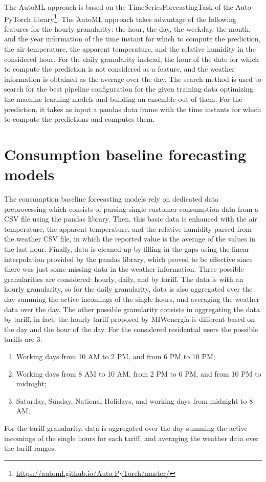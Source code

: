 The AutoML approach is based on the TimeSeriesForecastingTask of the Auto-PyTorch library\footnote{ \url{https://automl.github.io/Auto-PyTorch/master/} }.
The AutoML approach takes advantage of the following features for the hourly granularity: the hour, the day, the weekday, the month, and the year information of the time instant for which to compute the prediction, the air temperature, the apparent temperature, and the relative humidity in the considered hour.
For the daily granularity instead, the hour of the date for which to compute the prediction is not considered as a feature, and the weather information is obtained as the average over the day.
The search method is used to search for the best pipeline configuration for the given training data optimizing the machine learning models and building an ensemble out of them.
For the prediction, it takes as input a pandas data frame with the time instants for which to compute the predictions and computes them.


\section{Consumption baseline forecasting models}
\label{sec:baselineimpl}
\vspace{0.2 cm}

The consumption baseline forecasting models rely on dedicated data preprocessing which consists of parsing single customer consumption data from a CSV file using the pandas library.
Then, this basic data is enhanced with the air temperature, the apparent temperature, and the relative humidity parsed from the weather CSV file, in which the reported value is the average of the values in the last hour.
Finally, data is cleaned up by filling in the gaps using the linear interpolation provided by the pandas library, which proved to be effective since there was just some missing data in the weather information.
Three possible granularities are considered: hourly, daily, and by tariff.
The data is with an hourly granularity, so for the daily granularity, data is also aggregated over the day summing the active incomings of the single hours, and averaging the weather data over the day.
The other possible granularity consists in aggregating the data by tariff, in fact, the hourly tariff proposed by MIWenergía is different based on the day and the hour of the day.
For the considered residential users the possible tariffs are 3:
\begin{enumerate}
  \item Working days from 10 AM to 2 PM, and from 6 PM to 10 PM;
  \item Working days from 8 AM to 10 AM, from 2 PM to 6 PM, and from 10 PM to midnight;
  \item Saturday, Sunday, National Holidays, and working days from midnight to 8 AM.
\end{enumerate}
For the tariff granularity, data is aggregated over the day summing the active incomings of the single hours for each tariff, and averaging the weather data over the tariff ranges.

